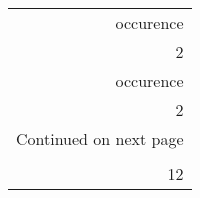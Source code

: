 \begin{longtable}{r}
\toprule
 occurence \\
         2 \\
\midrule
\endfirsthead

\toprule
 occurence \\
         2 \\
\midrule
\endhead
\midrule
\multicolumn{1}{r}{{Continued on next page}} \\
\midrule
\endfoot

\bottomrule
\endlastfoot
         3 \\
        12 \\
\end{longtable}
